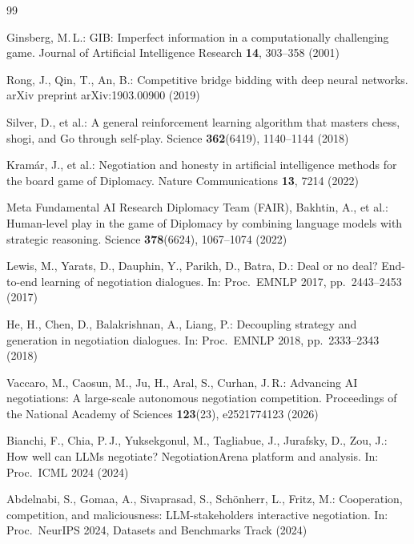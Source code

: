 \documentclass[runningheads]{llncs}
\begin{document}
\begin{thebibliography}{99}\small

Ginsberg, M.\,L.:
GIB: Imperfect information in a computationally challenging game.
Journal of Artificial Intelligence Research \textbf{14}, 303--358 (2001)

Rong, J., Qin, T., An, B.:
Competitive bridge bidding with deep neural networks.
arXiv preprint arXiv:1903.00900 (2019)

Silver, D., et al.:
A general reinforcement learning algorithm that masters chess, shogi,
and Go through self-play.
Science \textbf{362}(6419), 1140--1144 (2018)

Kram\'ar, J., et al.:
Negotiation and honesty in artificial intelligence methods for the
board game of Diplomacy.
Nature Communications \textbf{13}, 7214 (2022)

Meta Fundamental AI Research Diplomacy Team (FAIR), Bakhtin, A., et al.:
Human-level play in the game of Diplomacy by combining language models
with strategic reasoning.
Science \textbf{378}(6624), 1067--1074 (2022)

Lewis, M., Yarats, D., Dauphin, Y., Parikh, D., Batra, D.:
Deal or no deal? End-to-end learning of negotiation dialogues.
In: Proc.\ EMNLP 2017, pp.~2443--2453 (2017)

He, H., Chen, D., Balakrishnan, A., Liang, P.:
Decoupling strategy and generation in negotiation dialogues.
In: Proc.\ EMNLP 2018, pp.~2333--2343 (2018)

Vaccaro, M., Caosun, M., Ju, H., Aral, S., Curhan, J.\,R.:
Advancing AI negotiations: A large-scale autonomous negotiation
competition.
Proceedings of the National Academy of Sciences \textbf{123}(23),
e2521774123 (2026)

Bianchi, F., Chia, P.\,J., Yuksekgonul, M., Tagliabue, J., Jurafsky, D.,
Zou, J.:
How well can LLMs negotiate? NegotiationArena platform and analysis.
In: Proc.\ ICML 2024 (2024)

Abdelnabi, S., Gomaa, A., Sivaprasad, S., Sch\"onherr, L., Fritz, M.:
Cooperation, competition, and maliciousness: LLM-stakeholders
interactive negotiation.
In: Proc.\ NeurIPS 2024, Datasets and Benchmarks Track (2024)


\end{thebibliography}
\end{document}
